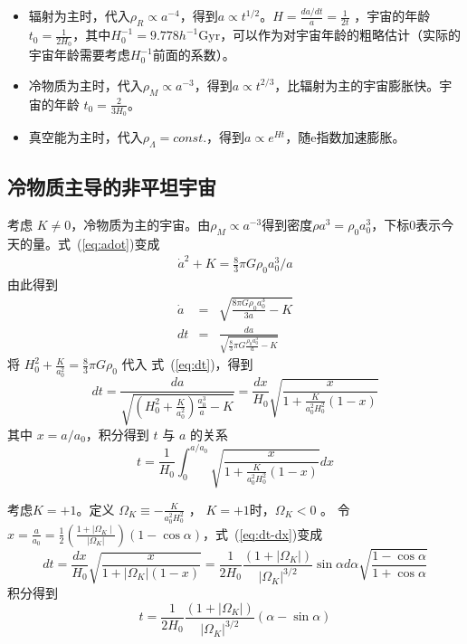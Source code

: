 \documentclass[12pt]{ctexart}
\newcommand{\refeq}[1]{式~(\ref{#1})}
\begin{document}
\begin{itemize}
    \item 辐射为主时，代入$\rho_R\propto a^{-4}$，得到$a\propto t^{1/2}$。$H=\frac{da/dt}{a}=\frac{1}{2t}$ ，宇宙的年龄 $t_0=\frac{1}{2H_0}$，其中$H_0^{-1}= 9.778 h^{-1} \mathrm{Gyr}$，可以作为对宇宙年龄的粗略估计（实际的宇宙年龄需要考虑$H_0^{-1}$前面的系数）。
    \item 冷物质为主时，代入$\rho_M\propto a^{-3}$，得到$a\propto t^{2/3}$，比辐射为主的宇宙膨胀快。宇宙的年龄 $t_0=\frac{2}{3H_0}$。
    \item 真空能为主时，代入$\rho_\Lambda =const.$，得到$a\propto e^{Ht}$，随e指数加速膨胀。
\end{itemize}

\subsection{冷物质主导的非平坦宇宙}
考虑 $K\neq 0$，冷物质为主的宇宙。由$\rho_M\propto a^{-3}$得到密度$\rho a^3 = \rho_0 a^3_0$，下标0表示今天的量。\refeq{eq:adot}变成
\begin{eqnarray}
    \dot{a}^2 + K = \frac{8}{3} \pi G \rho_0 a_0^3/a 
\end{eqnarray} 
由此得到
\begin{eqnarray}
    \dot{a}&=&\sqrt{\frac{8 \pi G \rho_{0} a_{0}^{3}}{3 a}-K} \\
    d t&=&\frac{d a}{\sqrt{\frac{8}{3} \pi G \frac{\rho_{0} a_{0}^{3}}{a}-K}} \label{eq:dt}
\end{eqnarray}
将 $H_0^2+\frac{K}{a_0^2}=\frac{8}{3}\pi G \rho_0$  代入 \refeq{eq:dt}，得到
\begin{equation}
    d t=\frac{d a}{\sqrt{\left(H_{0}^{2}+\frac{K}{a_{0}^{2}}\right) \frac{a_{0}^{3}}{a}-K}}=\frac{d x}{H_{0}} \sqrt{\frac{x}{1+\frac{K}{a_{0}^{2} H_{0}^{2}}(1-x)}} \label{eq:dt-dx}
\end{equation}
其中 $x=a/a_0$，积分得到 $t$ 与 $a$ 的关系 
\begin{equation}
    t=\frac{1}{H_{0}} \int_{0}^{a/a_{0}} \sqrt{\frac{x}{1+\frac{K}{a_{0}^{2} H_{0}^{2}}(1-x)}} d x
\end{equation}

考虑$K=+1$。定义 $\Omega_K \equiv -\frac{K}{a_0^2 H_0^2}$ ， $K=+1$时，$\Omega_K <0$ 。
令 $x=\frac{a}{a_{0}}=\frac{1}{2}\left(\frac{1+| \Omega_{K} \mid}{\left|\Omega_{K}\right|}\right)(1-\cos \alpha)$，\refeq{eq:dt-dx}变成
\begin{equation}
    d t=\frac{d x}{H_{0}} \sqrt{\frac{x}{1+\left|\Omega_{K}\right|(1-x)}}=\frac{1}{2 H_{0}} \frac{\left(1+\left|\Omega_{K}\right|\right)}{\left|\Omega_{K}\right|^{3 / 2}} \sin \alpha d \alpha \sqrt{\frac{1-\cos \alpha}{1+ \cos  \alpha}}
\end{equation}
积分得到
\begin{equation}
    t=\frac{1}{2 H_{0}} \frac{\left(1+\left|\Omega_{K}\right|\right)}{\left|\Omega_{K}\right|^{3 / 2}}(\alpha-\sin \alpha)
\end{equation}
\end{document}

